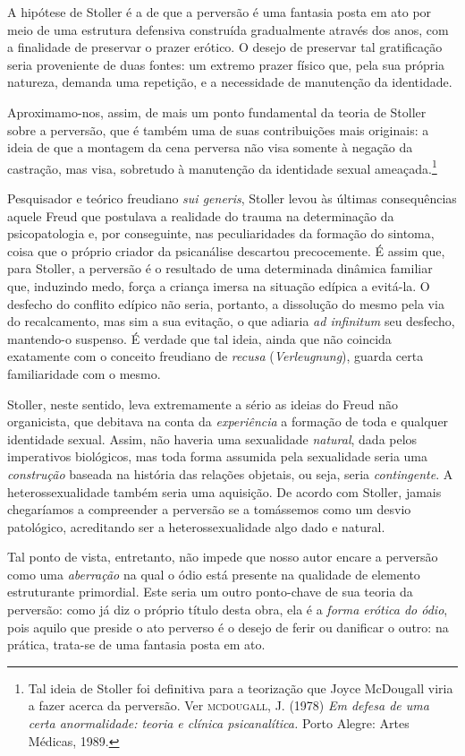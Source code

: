 A hipótese de Stoller é a de que a perversão é uma fantasia posta em ato
por meio de uma estrutura defensiva construída gradualmente através dos
anos, com a finalidade de preservar o prazer erótico. O desejo de
preservar tal gratificação seria proveniente de duas fontes: um extremo
prazer físico que, pela sua própria natureza, demanda uma repetição, e a
necessidade de manutenção da identidade.

Aproximamo-nos, assim, de mais um ponto fundamental da teoria de Stoller
sobre a perversão, que é também uma de suas contribuições mais
originais: a ideia de que a montagem da cena perversa não visa somente à
negação da castração, mas visa, sobretudo à manutenção da identidade
sexual ameaçada.\footnote{Tal ideia de Stoller foi definitiva para a
  teorização que Joyce McDougall viria a fazer acerca da perversão. Ver
  \textsc{mcdougall}, J. (1978) \emph{Em defesa de uma certa
  anormalidade: teoria e clínica psicanalítica.} Porto Alegre: Artes
  Médicas, 1989.}

Pesquisador e teórico freudiano \emph{sui generis}, Stoller levou às
últimas consequências aquele Freud que postulava a realidade do trauma
na determinação da psicopatologia e, por conseguinte, nas peculiaridades
da formação do sintoma, coisa que o próprio criador da psicanálise
descartou precocemente. É assim que, para Stoller, a perversão é o
resultado de uma determinada dinâmica familiar que, induzindo medo,
força a criança imersa na situação edípica a evitá-la. O desfecho do
conflito edípico não seria, portanto, a dissolução do mesmo pela via do
recalcamento, mas sim a sua evitação, o que adiaria \emph{ad infinitum}
seu desfecho, mantendo-o suspenso. É verdade que tal ideia, ainda que
não coincida exatamente com o conceito freudiano de \emph{recusa}
(\emph{Verleugnung}), guarda certa familiaridade com o mesmo.

Stoller, neste sentido, leva extremamente a sério as ideias do Freud não
organicista, que debitava na conta da \emph{experiência} a formação de
toda e qualquer identidade sexual. Assim, não haveria uma sexualidade
\emph{natural}, dada pelos imperativos biológicos, mas toda forma
assumida pela sexualidade seria uma \emph{construção} baseada na
história das relações objetais, ou seja, seria \emph{contingente}. A
heterossexualidade também seria uma aquisição. De acordo com Stoller,
jamais chegaríamos a compreender a perversão se a tomássemos como um
desvio patológico, acreditando ser a heterossexualidade algo dado e
natural.

Tal ponto de vista, entretanto, não impede que nosso autor encare a
perversão como uma \emph{aberração} na qual o ódio está presente na
qualidade de elemento estruturante primordial. Este seria um outro
ponto-chave de sua teoria da perversão: como já diz o próprio título
desta obra, ela é a \emph{forma erótica do ódio}, pois aquilo que
preside o ato perverso é o desejo de ferir ou danificar o outro: na
prática, trata-se de uma fantasia posta em ato.

